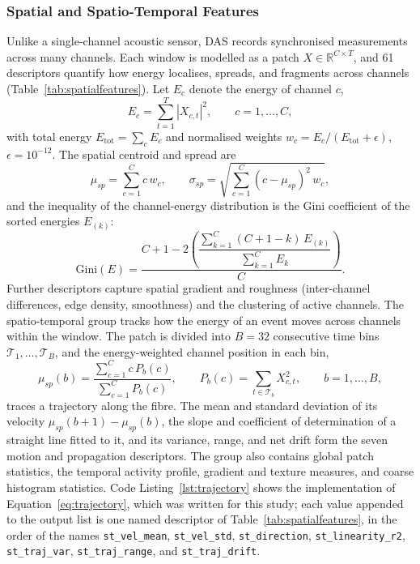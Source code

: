 \subsubsection{Spatial and Spatio-Temporal Features}
\label{sec:chap3SpatialFeatures}
Unlike a single-channel acoustic sensor, DAS records synchronised measurements across many channels. Each window is modelled as a patch $X \in \mathbb{R}^{C \times T}$, and 61 descriptors quantify how energy localises, spreads, and fragments across channels (Table~\ref{tab:spatialfeatures}). Let $E_c$ denote the energy of channel $c$,
\begin{equation}
	E_c = \sum_{t=1}^{T} |X_{c,t}|^2, \qquad c = 1, \ldots, C,
	\label{eq:channelenergy}
\end{equation}
with total energy $E_{\mathrm{tot}} = \sum_{c} E_c$ and normalised weights $w_c = E_c / (E_{\mathrm{tot}} + \epsilon)$, $\epsilon = 10^{-12}$. The spatial centroid and spread are
\begin{equation}
	\mu_{sp} = \sum_{c=1}^{C} c\, w_c, \qquad
	\sigma_{sp} = \sqrt{\sum_{c=1}^{C} (c - \mu_{sp})^2\, w_c},
	\label{eq:spatialcentroid}
\end{equation}
and the inequality of the channel-energy distribution is the Gini coefficient of the sorted energies $E_{(k)}$:
\begin{equation}
	\mathrm{Gini}(E) = \frac{C + 1 - 2\left(\dfrac{\sum_{k=1}^{C}(C + 1 - k)\, E_{(k)}}{\sum_{k=1}^{C} E_k}\right)}{C}.
	\label{eq:gini}
\end{equation}
Further descriptors capture spatial gradient and roughness (inter-channel differences, edge density, smoothness) and the clustering of active channels. The spatio-temporal group tracks how the energy of an event moves across channels within the window. The patch is divided into $B = 32$ consecutive time bins $\mathcal{T}_1, \ldots, \mathcal{T}_B$, and the energy-weighted channel position in each bin,
\begin{equation}
	\mu_{sp}(b) = \frac{\sum_{c=1}^{C} c\, P_b(c)}{\sum_{c=1}^{C} P_b(c)}, \qquad P_b(c) = \sum_{t \in \mathcal{T}_b} X_{c,t}^2, \qquad b = 1, \ldots, B,
	\label{eq:trajectory}
\end{equation}
traces a trajectory along the fibre. The mean and standard deviation of its velocity $\mu_{sp}(b+1) - \mu_{sp}(b)$, the slope and coefficient of determination of a straight line fitted to it, and its variance, range, and net drift form the seven motion and propagation descriptors. The group also contains global patch statistics, the temporal activity profile, gradient and texture measures, and coarse histogram statistics. Code Listing~\ref{lst:trajectory} shows the implementation of Equation~\eqref{eq:trajectory}, which was written for this study; each value appended to the output list is one named descriptor of Table~\ref{tab:spatialfeatures}, in the order of the names \texttt{st\_vel\_mean}, \texttt{st\_vel\_std}, \texttt{st\_direction}, \texttt{st\_linearity\_r2}, \texttt{st\_traj\_var}, \texttt{st\_traj\_range}, and \texttt{st\_traj\_drift}.

